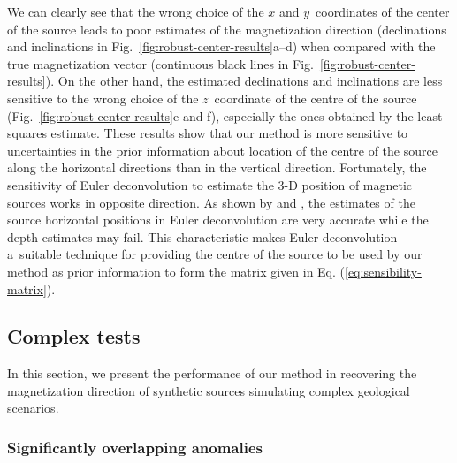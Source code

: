 \documentclass[journal abbreviation, npg]{copernicus}
\begin{document}
We can clearly see that the wrong choice of the $x$ and $y$~coordinates of
the center of the source leads to poor estimates of the magnetization
direction (declinations and inclinations in
Fig.~\ref{fig:robust-center-results}a--d) when compared with the true
magnetization vector (continuous black lines in
Fig.~\ref{fig:robust-center-results}). On the other hand, the estimated
declinations and inclinations are less sensitive to the wrong choice of the
$z$~coordinate of the centre of the source
(Fig.~\ref{fig:robust-center-results}e and f), especially the ones obtained
by the least-squares estimate. These results show that our method is more
sensitive to uncertainties in the prior information about location of the
centre of the source along the horizontal directions than in the vertical
direction. Fortunately, the sensitivity of Euler deconvolution to estimate
the 3-D position of magnetic sources works in opposite direction. As shown by
\citet{silva-barbosa2003} and \citet{melo-etal2013}, the estimates of the
source horizontal positions in Euler deconvolution are very accurate while
the depth estimates may fail. This characteristic makes Euler deconvolution
a~suitable technique for providing the centre of the source to be used by our
method as prior information to form the matrix given in Eq.
(\ref{eq:sensibility-matrix}).

\subsection{Complex tests}

In this section, we present the performance of our method in recovering
the magnetization direction of synthetic sources simulating complex 
geological scenarios.

\subsubsection*{Significantly overlapping anomalies}
\end{document}

